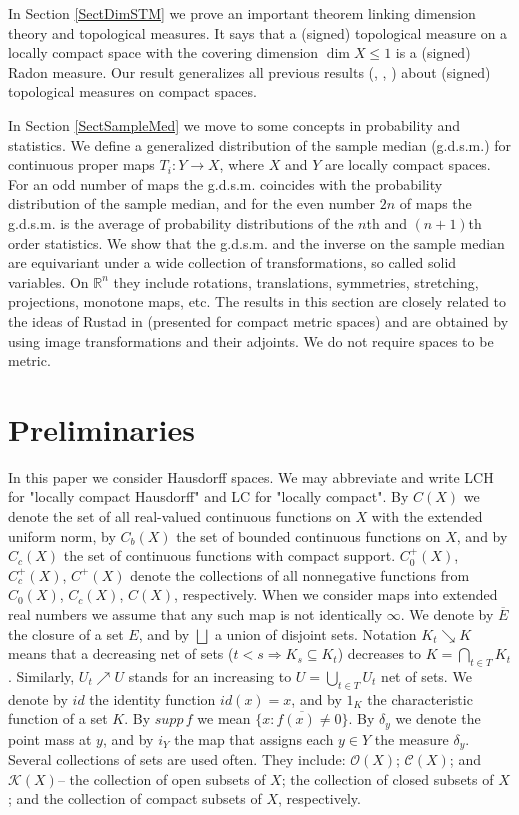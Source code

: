 \documentclass[sn-mathphys-num]{sn-jnl}%
\theoremstyle{thmstyleone}%
\theoremstyle{definition}
\begin{document}
In Section \ref{SectDimSTM} we prove an important theorem linking dimension theory and topological measures. It says that  
a (signed) topological measure on a locally compact space with the covering dimension $\dim X \le 1$ is a (signed) Radon measure. Our result 
generalizes all previous results (\cite{Wheeler}, \cite{Grubb:SignedqmDimTheory}, \cite{Svistula:Signed}) 
about (signed) topological measures on compact spaces.

In Section \ref{SectSampleMed} we move to some concepts in probability and statistics. 
We define a generalized distribution of the sample median (g.d.s.m.) for continuous proper maps $T_i : Y \longrightarrow X$, 
where $X$ and $Y$ are locally compact spaces. 
For an odd number of maps the g.d.s.m. coincides with the probability distribution of the sample median, and for the even number $2n$ of maps 
 the g.d.s.m. is the average of probability distributions of the $n$th  and $(n+1)$th order statistics. 
We show that the g.d.s.m. and the inverse on the sample median are equivariant under a wide collection of transformations, so called solid variables. 
On $\mathbb{R}^n$ they include rotations, translations, symmetries, stretching, projections, monotone maps, etc.    
The results in this section are closely related to the ideas of Rustad in \cite{AlfMedian} (presented for compact metric spaces) 
and are obtained by using image transformations and their adjoints. We do not require spaces to be metric. 

\section{Preliminaries}

In this paper we consider Hausdorff spaces. We may abbreviate and write LCH for  "locally compact Hausdorff" and LC for  "locally compact". 
By $C(X)$ we denote the set of all real-valued continuous functions on $X$ with the extended uniform norm, 
by $C_b(X)$ the set of bounded continuous functions on $X$, and  
by $C_c(X)$ the set of continuous functions with compact support.  
$C_0^+(X)$, $C_c^+(X)$, $C^+(X)$ denote the collections of all nonnegative functions from $C_0(X)$, $C_c(X)$, $C(X)$, respectively.
When we consider maps into extended real numbers we assume that any such map is not identically $\infty$. 
We denote by $\overline E$ the closure of a set $E$, and by $ \bigsqcup$ a union of disjoint sets.
Notation $K_t \searrow K$ means that a decreasing net of sets ($t < s \Longrightarrow K_s \subseteq K_t $) decreases to 
$K = \bigcap_{t \in T} K_t$. Similarly, $U_t \nearrow U$ stands for an increasing to $U = \bigcup_{t \in T} U_t$ net of sets.
We denote by $id$ the identity function $id(x) = x$, 
and by $1_K$ the characteristic function of a set $K$. By $ supp \,  f $ we mean $ \overline{ \{x: f(x) \neq 0 \} }$.
By $ \delta_y$ we denote the point mass at $y$, and by $i_Y$ the map that assigns each $y \in Y$ the measure $ \delta_y$.
Several collections of sets are used often.   They include:
$\mathscr{O}(X)$;
$\mathscr{C}(X)$; and
$\mathscr{K}(X)$-- 
the collection of open subsets of $X$;  the collection of closed subsets of   $X $;
and the collection of compact subsets of   $X $, respectively.
\end{document}
